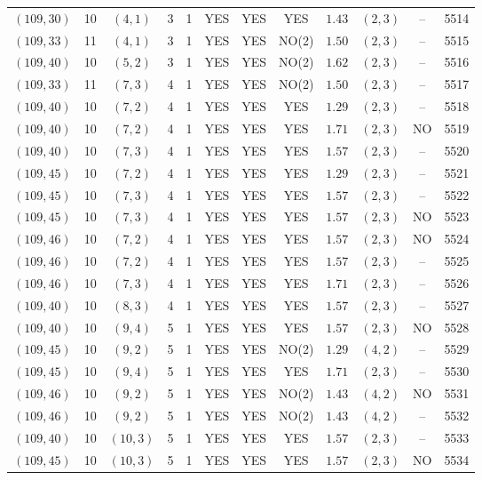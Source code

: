 \begin{longtable}{|c|c|c|c|c|c|c|c|c|c|c|c|}
$(109,30)$ & 10 & $(4,1)$ & 3 & 1 & YES & YES & YES & $1.43$ & $(2,3)$ & -- & 5514\\
$(109,33)$ & 11 & $(4,1)$ & 3 & 1 & YES & YES & NO(2) & $1.50$ & $(2,3)$ & -- & 5515\\
$(109,40)$ & 10 & $(5,2)$ & 3 & 1 & YES & YES & NO(2) & $1.62$ & $(2,3)$ & -- & 5516\\
$(109,33)$ & 11 & $(7,3)$ & 4 & 1 & YES & YES & NO(2) & $1.50$ & $(2,3)$ & -- & 5517\\
$(109,40)$ & 10 & $(7,2)$ & 4 & 1 & YES & YES & YES & $1.29$ & $(2,3)$ & -- & 5518\\
$(109,40)$ & 10 & $(7,2)$ & 4 & 1 & YES & YES & YES & $1.71$ & $(2,3)$ & NO & 5519\\
$(109,40)$ & 10 & $(7,3)$ & 4 & 1 & YES & YES & YES & $1.57$ & $(2,3)$ & -- & 5520\\
$(109,45)$ & 10 & $(7,2)$ & 4 & 1 & YES & YES & YES & $1.29$ & $(2,3)$ & -- & 5521\\
$(109,45)$ & 10 & $(7,3)$ & 4 & 1 & YES & YES & YES & $1.57$ & $(2,3)$ & -- & 5522\\
$(109,45)$ & 10 & $(7,3)$ & 4 & 1 & YES & YES & YES & $1.57$ & $(2,3)$ & NO & 5523\\
$(109,46)$ & 10 & $(7,2)$ & 4 & 1 & YES & YES & YES & $1.57$ & $(2,3)$ & NO & 5524\\
$(109,46)$ & 10 & $(7,2)$ & 4 & 1 & YES & YES & YES & $1.57$ & $(2,3)$ & -- & 5525\\
$(109,46)$ & 10 & $(7,3)$ & 4 & 1 & YES & YES & YES & $1.71$ & $(2,3)$ & -- & 5526\\
$(109,40)$ & 10 & $(8,3)$ & 4 & 1 & YES & YES & YES & $1.57$ & $(2,3)$ & -- & 5527\\
$(109,40)$ & 10 & $(9,4)$ & 5 & 1 & YES & YES & YES & $1.57$ & $(2,3)$ & NO & 5528\\
$(109,45)$ & 10 & $(9,2)$ & 5 & 1 & YES & YES & NO(2) & $1.29$ & $(4,2)$ & -- & 5529\\
$(109,45)$ & 10 & $(9,4)$ & 5 & 1 & YES & YES & YES & $1.71$ & $(2,3)$ & -- & 5530\\
$(109,46)$ & 10 & $(9,2)$ & 5 & 1 & YES & YES & NO(2) & $1.43$ & $(4,2)$ & NO & 5531\\
$(109,46)$ & 10 & $(9,2)$ & 5 & 1 & YES & YES & NO(2) & $1.43$ & $(4,2)$ & -- & 5532\\
$(109,40)$ & 10 & $(10,3)$ & 5 & 1 & YES & YES & YES & $1.57$ & $(2,3)$ & -- & 5533\\
$(109,45)$ & 10 & $(10,3)$ & 5 & 1 & YES & YES & YES & $1.57$ & $(2,3)$ & NO & 5534\\

\end{longtable}
